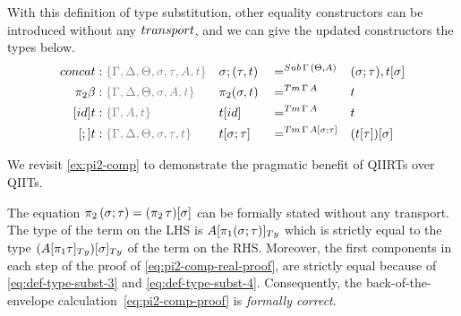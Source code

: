 \documentclass[a4paper,UKenglish,numberwithinsect,cleveref,thm-restate]{lipics-v2021}
\begin{document}
With this definition of type substitution, other equality constructors can be introduced without any $\transp$, and we can give the updated constructors the types below.
\begin{alignat*}{5}
  \mathsf{concat} & : \implicit{\Gamma, \Delta, \Theta, \sigma, \tau, A, t} &&\sigma ; (\tau , t) && =^{\Sub\,\Gamma\,(\Theta, A)} &&  (\sigma ; \tau), \sub{t}{\sigma} \\
  \pi_2\beta      & : \implicit{\Gamma, \Delta, \Theta, \sigma, A, t} && \pi_2(\sigma , t)        && =^{\Tm\,\Gamma\, A} &&  t \\
  [\idS]t         & : \implicit{\Gamma, A, t} && {\sub{t}{\idS}}          && =^{\Tm\,\Gamma\,A} && t \\
  [;]t            & : \implicit{\Gamma, \Delta, \Theta, \sigma, \tau, t} && {\sub{t}{\sigma ; \tau}} && =^{\Tm\,\Gamma\,\sub{A}{\sigma ; \tau}} && {\sub{(\sub{t}{\tau})}{\sigma}}
\end{alignat*}

We revisit \cref{ex:pi2-comp} to demonstrate the pragmatic benefit of QIIRTs over QIITs.
\begin{example} \label{ex:pi-comp-qiirt}
  The equation $\pi_2\,(\sigma; \tau) = {{(\pi_2\,\tau)}[ \sigma ]}$ can be formally stated without any transport.
  The type of the term on the LHS is $\subTy{A}{\pi_1(\sigma;\tau)}$ which is strictly equal to the type $\subTy{(\subTy{A}{\pi_1\tau})}{\sigma}$ of the term on the RHS.
  Moreover, the first components in each step of the proof of \eqref{eq:pi2-comp-real-proof}, are strictly equal because of \eqref{eq:def-type-subst-3} and \eqref{eq:def-type-subst-4}.
  Consequently, the back-of-the-envelope calculation~\eqref{eq:pi2-comp-proof} is \emph{formally correct}.
\end{example}
\end{document}
